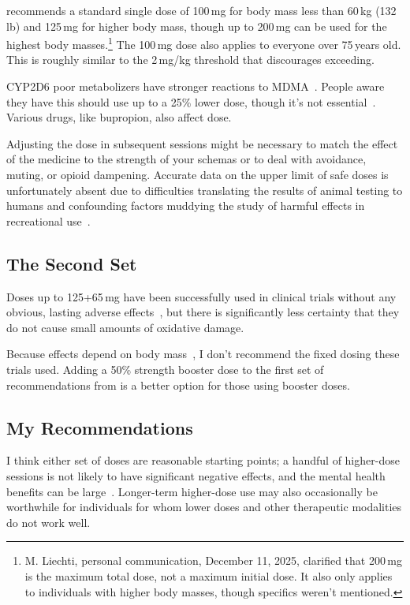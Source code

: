 \documentclass[11pt,oneside]{book}
\let\cite\parencite
\begin{document}
\textcite{liechtiInteractions} recommends a standard single dose of 100\,mg for body mass less than 60\,kg (132\,lb) and 125\,mg for higher body mass, though up to 200\,mg can be used for the highest body masses.\footnote{M. Liechti, personal communication, December 11, 2025, clarified that 200\,mg is the maximum total dose, not a maximum initial dose. It also only applies to individuals with higher body masses, though specifics weren't mentioned.} The 100\,mg dose also applies to everyone over 75\,years old. This is roughly similar to the 2\,mg/kg threshold that \textcite{baggottSupplements} discourages exceeding.

CYP2D6 poor metabolizers have stronger reactions to MDMA~\cite{schmid2016cyp2d6}. People aware they have this should use up to a 25\% lower dose, though it's not essential~\cite{liechtiInteractions}. Various drugs, like bupropion, also affect dose.

Adjusting the dose in subsequent sessions might be necessary to match the effect of the medicine to the strength of your schemas or to deal with avoidance, muting, or opioid dampening. Accurate data on the upper limit of safe doses is unfortunately absent due to difficulties translating the results of animal testing to humans and confounding factors muddying the study of harmful effects in recreational use~\cite{passieHistory}.

\subsection*{The Second Set}
Doses up to 125+65\,mg have been successfully used in clinical trials without any obvious, lasting adverse effects~\cite{mithoeferRETRACTEDARTICLEMDMAassisted2019}, but there is significantly less certainty that they do not cause small amounts of oxidative damage.

Because effects depend on body mass~\cite{studerusResponse}, I don't recommend the fixed dosing these trials used. Adding a 50\% strength booster dose to the first set of recommendations from \textcite{liechtiInteractions} is a better option for those using booster doses.

\subsection*{My Recommendations}
I think either set of doses are reasonable starting points; a handful of higher-dose sessions is not likely to have significant negative effects, and the mental health benefits can be large~\cite{mitchellMDMAClinicalTrial2,mitchellMDMAClinicalTrial}. Longer-term higher-dose use may also occasionally be worthwhile for individuals for whom lower doses and other therapeutic modalities do not work well.
\end{document}
